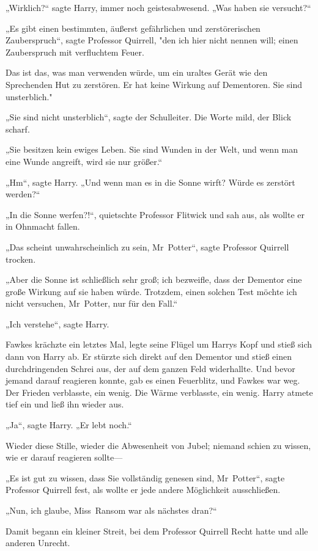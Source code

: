 {„Wirklich?“ sagte Harry, immer noch geistesabwesend. „Was haben sie versucht?“

„Es gibt einen bestimmten, äußerst gefährlichen und zerstörerischen Zauberspruch“, sagte Professor Quirrell, "den ich hier nicht nennen will; einen Zauberspruch mit verfluchtem Feuer.

Das ist das, was man verwenden würde, um ein uraltes Gerät wie den Sprechenden Hut zu zerstören. Er hat keine Wirkung auf Dementoren. Sie sind unsterblich."

„Sie sind nicht unsterblich“, sagte der Schulleiter. Die Worte mild, der Blick scharf.

„Sie besitzen kein ewiges Leben. Sie sind Wunden in der Welt, und wenn man eine Wunde angreift, wird sie nur größer.“

„Hm“, sagte Harry. „Und wenn man es in die Sonne wirft? Würde es zerstört werden?“

„In die Sonne werfen?!“, quietschte Professor Flitwick und sah aus, als wollte er in Ohnmacht fallen.

„Das scheint unwahrscheinlich zu sein, Mr~Potter“, sagte Professor Quirrell trocken.

„Aber die Sonne ist schließlich sehr groß; ich bezweifle, dass der Dementor eine große Wirkung auf sie haben würde. Trotzdem, einen solchen Test möchte ich nicht versuchen, Mr~Potter, nur für den Fall.“

„Ich verstehe“, sagte Harry.

Fawkes krächzte ein letztes Mal, legte seine Flügel um Harrys Kopf und stieß sich dann von Harry ab. Er stürzte sich direkt auf den Dementor und stieß einen durchdringenden Schrei aus, der auf dem ganzen Feld widerhallte. Und bevor jemand darauf reagieren konnte, gab es einen Feuerblitz, und Fawkes war weg. Der Frieden verblasste, ein wenig. Die Wärme verblasste, ein wenig. Harry atmete tief ein und ließ ihn wieder aus.

„Ja“, sagte Harry. „Er lebt noch.“

Wieder diese Stille, wieder die Abwesenheit von Jubel; niemand schien zu wissen, wie er darauf reagieren sollte—

„Es ist gut zu wissen, dass Sie vollständig genesen sind, Mr~Potter“, sagte Professor Quirrell fest, als wollte er jede andere Möglichkeit ausschließen.

„Nun, ich glaube, Miss~Ransom war als nächstes dran?“

Damit begann ein kleiner Streit, bei dem Professor Quirrell Recht hatte und alle anderen Unrecht.

}
